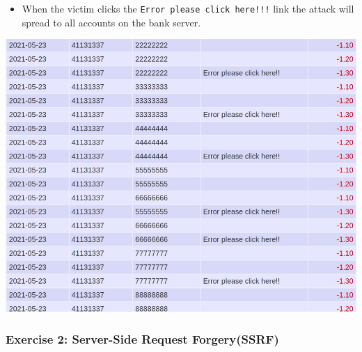 \begin{Shaded}
\begin{Highlighting}[]
\NormalTok{            \}}
\NormalTok{        \})}\OperatorTok{;}

        \OperatorTok{=}  \OperatorTok{+}\OperatorTok{+} \OperatorTok{;}

        \OperatorTok{,} \NormalTok{)}\OperatorTok{;}

\NormalTok{    \}}

\end{Highlighting}
\end{Shaded}

\begin{itemize}
\tightlist
\item
  When the victim clicks the \texttt{Error\ please\ click\ here!!!} link
  the attack will spread to all accounts on the bank server.
\end{itemize}

\includegraphics{images/task2/1.5.JPG}

\hypertarget{exercise-2-server-side-request-forgeryssrf}{%
\subsubsection{Exercise 2: Server-Side Request
Forgery(SSRF)}\label{exercise-2-server-side-request-forgeryssrf}}

